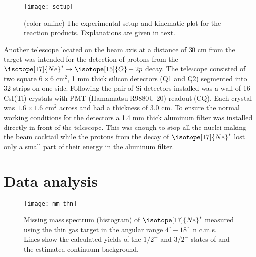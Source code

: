 \documentclass[superscriptaddress,showpacs,showkeys,twoside,floatfix,twocolumn]
{revtex4-1}
\begin{document}
\begin{figure}
\begin{center}
\texttt{[image: setup]}
\end{center}
%
\caption{(color online)
  The experimental setup and kinematic plot for the reaction products.
  Explanations are given in text.}
%
\label{fig:setup}
\end{figure}


Another telescope located on the beam axis at a distance of 30 cm
from the target was intended for the detection of protons from the
$\isotope[17]{Ne}^*\to \isotope[15]{O}+2p$ decay.
The telescope consisted of two square $6\times 6$ cm$^{2}$,
1 mm thick silicon detectors (Q1 and Q2) segmented into 32 strips on one side.
Following the pair of Si detectors installed was a wall of 16 CsI(Tl) crystals
with PMT (Hamamatsu R9880U-20) readout (CQ).
Each crystal was $1.6 \times 1.6$ cm$^{2}$ across and had a thickness of 3.0 cm.
To ensure the normal working conditions for the detectors
a 1.4 mm thick aluminum filter was installed directly in front of the telescope.
This was enough to stop all the nuclei making the beam cocktail while
the protons from the decay of $\isotope[17]{Ne}^*$ lost only a small part of
their energy in the aluminum filter.

\section{Data analysis}
\label{sec:data-analysis}

\begin{figure}
\begin{center}
\texttt{[image: mm-thn]}
\end{center}
%
\caption{Missing mass spectrum (histogram)
  of \(\isotope[17]{Ne}^*\)
  measured using the thin gas target in the angular range $4^\circ-18^\circ$ in c.m.s.
  Lines show the calculated yields of the \(1/2^-\) and \(3/2^-\) states
  of  and the estimated continuum background.}
%
\label{fig:thin_target}
\end{figure}
\end{document}
